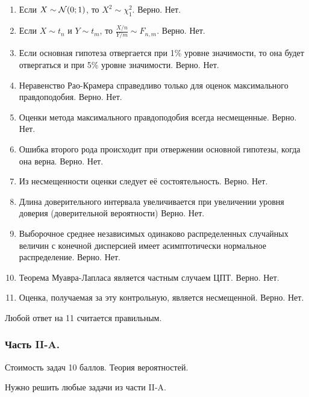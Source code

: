 \begin{enumerate}
\item Если $X\sim \mathcal{N}(0;1)$, то $X^{2}\sim \chi^{2}_{1}$. Верно. Нет.
\item Если $X\sim t_{n}$ и $Y\sim t_{m}$, то $\frac{X/n}{Y/m}\sim F_{n,m}$. Верно. Нет.
\item Если основная гипотеза отвергается  при 1\% уровне значимости, то она будет отвергаться и при 5\% уровне значимости. Верно. Нет.
\item Неравенство Рао-Крамера справедливо только для оценок максимального правдоподобия. Верно. Нет.
\item Оценки метода максимального правдоподобия всегда несмещенные. Верно. Нет.
\item Ошибка второго рода происходит при отвержении основной гипотезы, когда она верна. Верно. Нет.
\item Из несмещенности оценки следует её состоятельность. Верно. Нет.
\item Длина доверительного интервала увеличивается при увеличении уровня доверия (доверительной вероятности) Верно. Нет.
\item Выборочное среднее независимых одинаково распределенных случайных величин с конечной дисперсией имеет асимптотически нормальное распределение. Верно. Нет.
\item Теорема Муавра-Лапласа  является частным случаем ЦПТ. Верно. Нет.
\item Оценка, получаемая за эту контрольную, является несмещенной. Верно. Нет.
\end{enumerate}

Любой ответ на 11 считается правильным.

\subsubsection*{Часть II-A.}

Стоимость задач 10 баллов. Теория вероятностей.

Нужно решить любые \textbf{} задачи из части II-A.

